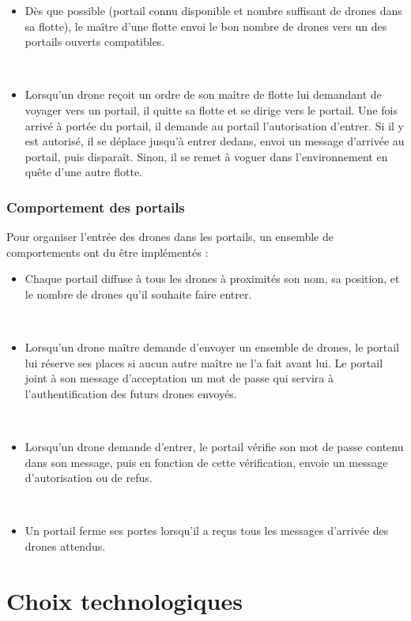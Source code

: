 \documentclass[11pt]{report}
\begin{document}
\begin{itemize}
~\
\item Dès que possible (portail connu disponible et nombre suffisant de drones dans sa flotte), le maître d'une flotte envoi le bon nombre de drones vers un des portails ouverts compatibles.

~\
\item Lorsqu'un drone reçoit un ordre de son maître de flotte lui demandant de voyager vers un portail, il quitte sa flotte et se dirige vers le portail. Une fois arrivé à portée du portail, il demande au portail l'autorisation d'entrer. Si il y est autorisé, il se déplace jusqu'à entrer dedans, envoi un message d'arrivée au portail, puis disparaît. Sinon, il se remet à voguer dans l'environnement en quête d'une autre flotte.
\end{itemize}

\subsubsection{Comportement des portails}

Pour organiser l'entrée des drones dans les portails, un ensemble de comportements ont du être implémentés : 

\begin{itemize}

\item Chaque portail diffuse à tous les drones à proximités son nom, sa position, et le nombre de drones qu'il souhaite faire entrer.

~\
\item Lorsqu'un drone maître demande d'envoyer un ensemble de drones, le portail lui réserve ses places si aucun autre maître ne l'a fait avant lui. Le portail joint à son message d'acceptation un mot de passe qui servira à l'authentification des futurs drones envoyés.

~\
\item Lorsqu'un drone demande d'entrer, le portail vérifie son mot de passe contenu dans son message, puis en fonction de cette vérification, envoie un message d'autorisation ou de refus.

~\
\item Un portail ferme ses portes lorsqu'il a reçus tous les messages d'arrivée des drones attendus.
\end{itemize}

\section{Choix technologiques}
\end{document}

